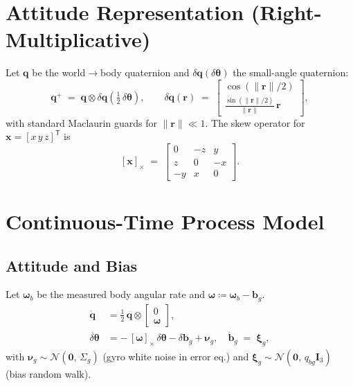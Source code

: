 \documentclass[11pt]{article}
\newcommand{\vect}[1]{\bm{#1}}
\newcommand{\mat}[1]{\bm{#1}}
\newcommand{\quat}[1]{\mathbf{#1}}
\newcommand{\T}{\mathsf{T}}
\newcommand{\I}{\mat{I}}
\newcommand{\skx}[1]{\left[ #1 \right]_\times}
\begin{document}
\section{Attitude Representation (Right-Multiplicative)}
\label{sec:attitude}
Let \(\quat{q}\) be the world\(\to\)body quaternion and
\(\delta\quat{q}(\delta\vect{\theta})\) the small-angle quaternion:
\begin{equation}
  \quat{q}^+ \;=\; \quat{q}\otimes \delta\quat{q}\!\left(\tfrac12\,\delta\vect{\theta}\right), 
  \qquad
  \delta\quat{q}(\vect{r}) \;=\;
  \begin{bmatrix}
    \cos(\|\vect{r}\|/2)\\
    \frac{\sin(\|\vect{r}\|/2)}{\|\vect{r}\|}\,\vect{r}
  \end{bmatrix},
  \label{eq:quat-update}
\end{equation}
with standard Maclaurin guards for \(\|\vect{r}\|\ll 1\).
The skew operator for \(\vect{x}=[x\,y\,z]^\T\) is
\begin{equation}
  \skx{\vect{x}} \;=\;
  \begin{bmatrix}
    0 & -z & y\\ z & 0 & -x\\ -y & x & 0
  \end{bmatrix}.
  \label{eq:skew}
\end{equation}

\section{Continuous-Time Process Model}
\label{sec:ct-model}
\subsection{Attitude and Bias}
Let \(\vect{\omega}_b\) be the measured body angular rate and
\(\vect{\omega} \coloneqq \vect{\omega}_b - \vect{b}_g\).
\begin{align}
  \dot{\quat{q}} &= \tfrac12\, \quat{q} \otimes \begin{bmatrix} 0 \\ \vect{\omega} \end{bmatrix},
  \label{eq:qdot}\\
  \dot{\delta\vect{\theta}} &= -\,\skx{\vect{\omega}}\,\delta\vect{\theta} - \delta\vect{b}_g + \vect{\nu}_g,
  \quad
  \dot{\vect{b}}_g \;=\; \vect{\xi}_g,
  \label{eq:theta-bg-ct}
\end{align}
with \(\vect{\nu}_g\sim\mathcal{N}(\vect{0},\,\Sigma_g)\) (gyro white noise in error eq.) and
\(\vect{\xi}_g\sim\mathcal{N}(\vect{0},\,q_{bg}\I_3)\) (bias random walk).
\end{document}
